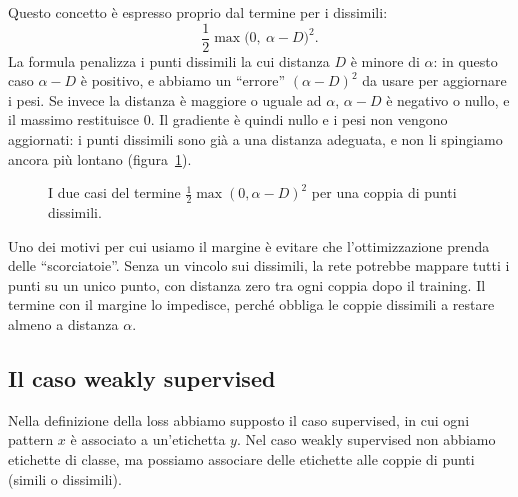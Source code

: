Questo concetto è espresso proprio dal termine per i dissimili:
\[
\frac{1}{2}\max\big(0,\ \alpha - D\big)^2.
\]
La formula penalizza i punti dissimili la cui distanza $D$ è minore di $\alpha$: in questo caso $\alpha - D$ è positivo, e abbiamo un ``errore'' $(\alpha - D)^2$ da usare per aggiornare i pesi. Se invece la distanza è maggiore o uguale ad $\alpha$, $\alpha - D$ è negativo o nullo, e il massimo restituisce 0. Il gradiente è quindi nullo e i pesi non vengono aggiornati: i punti dissimili sono già a una distanza adeguata, e non li spingiamo ancora più lontano (figura~\ref{fig:margine-casi}).

\begin{figure}[htbp]
\centering
{}
\caption{I due casi del termine $\frac{1}{2}\max(0, \alpha - D)^2$ per una coppia di punti dissimili.}
\label{fig:margine-casi}
\end{figure}

Uno dei motivi per cui usiamo il margine è evitare che l'ottimizzazione prenda delle ``scorciatoie''. Senza un vincolo sui dissimili, la rete potrebbe mappare tutti i punti su un unico punto, con distanza zero tra ogni coppia dopo il training. Il termine con il margine lo impedisce, perché obbliga le coppie dissimili a restare almeno a distanza $\alpha$.

\subsection{Il caso weakly supervised}
Nella definizione della loss abbiamo supposto il caso supervised, in cui ogni pattern $x$ è associato a un'etichetta $y$. Nel caso weakly supervised non abbiamo etichette di classe, ma possiamo associare delle etichette alle coppie di punti (simili o dissimili).

